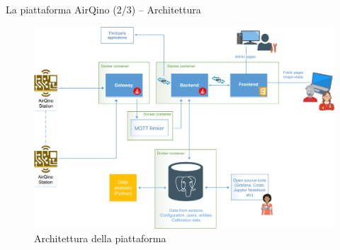 \begin{frame}[t]{La piattaforma AirQino (2/3) – Architettura}
\begin{center}

\begin{figure}[H]
\centering
\captionsetup{justification=centering}
\includegraphics[width=.8\textwidth]{images/airqino_arch.png}
\caption{Architettura della piattaforma}
\end{figure}

\end{center}
\end{frame}


